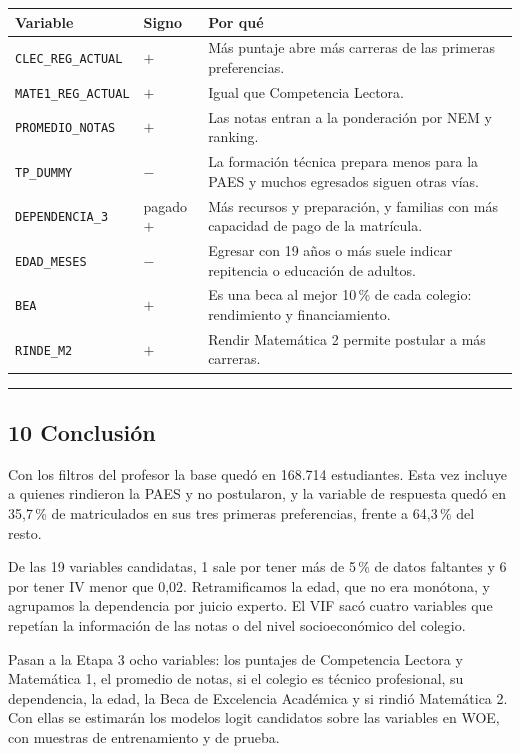\documentclass[11pt]{article}
\begin{document}
\begin{center}
\begin{tabular}{>{\raggedright\arraybackslash}p{4.2cm}
                >{\centering\arraybackslash}p{1.9cm}
                >{\raggedright\arraybackslash}p{7.3cm}}
\toprule
\textbf{Variable} & \textbf{Signo} & \textbf{Por qué} \\
\midrule
\texttt{CLEC\_REG\_ACTUAL}  & $+$ & Más puntaje abre más carreras de las primeras preferencias. \\
\texttt{MATE1\_REG\_ACTUAL} & $+$ & Igual que Competencia Lectora. \\
\texttt{PROMEDIO\_NOTAS}    & $+$ & Las notas entran a la ponderación por NEM y ranking. \\
\texttt{TP\_DUMMY}          & $-$ & La formación técnica prepara menos para la PAES y muchos egresados siguen otras vías. \\
\texttt{DEPENDENCIA\_3}     & pagado $+$ & Más recursos y preparación, y familias con más capacidad de pago de la matrícula. \\
\texttt{EDAD\_MESES}        & $-$ & Egresar con 19 años o más suele indicar repitencia o educación de adultos. \\
\texttt{BEA}                & $+$ & Es una beca al mejor 10\,\% de cada colegio: rendimiento y financiamiento. \\
\texttt{RINDE\_M2}          & $+$ & Rendir Matemática 2 permite postular a más carreras. \\
\bottomrule
\end{tabular}
\end{center}

\medskip\hrule\medskip

\subsection*{10 \; Conclusión}

Con los filtros del profesor la base quedó en 168.714 estudiantes. Esta
vez incluye a quienes rindieron la PAES y no postularon, y la variable de
respuesta quedó en 35,7\,\% de matriculados en sus tres primeras
preferencias, frente a 64,3\,\% del resto.

De las 19 variables candidatas, 1 sale por tener más de 5\,\% de datos
faltantes y 6 por tener IV menor que 0,02.
Retramificamos la edad, que no
era monótona, y agrupamos la dependencia por juicio experto. El VIF sacó
cuatro variables que repetían la información de las notas o del nivel
socioeconómico del colegio.

Pasan a la Etapa 3 ocho variables: los puntajes de Competencia Lectora
y Matemática 1, el promedio de notas, si el colegio es técnico
profesional, su dependencia, la edad, la Beca de Excelencia Académica y
si rindió Matemática 2. Con ellas se
estimarán los modelos logit candidatos sobre las variables en WOE, con
muestras de entrenamiento y de prueba.
\end{document}

